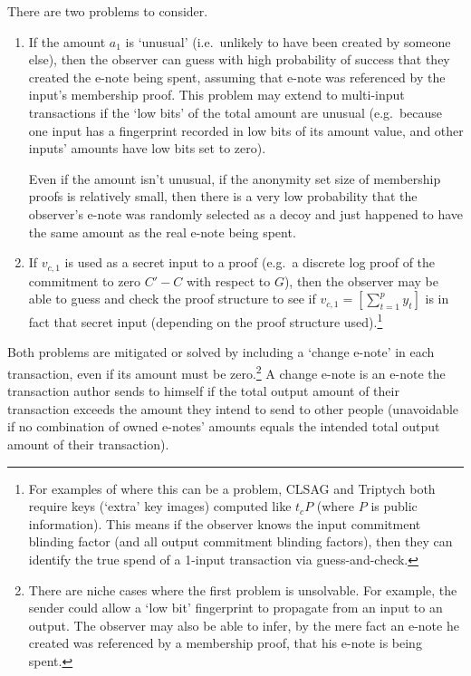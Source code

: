 There are two problems to consider.
\begin{enumerate}
    \item If the amount $a_1$ is `unusual' (i.e.\ unlikely to have been created by someone else), then the observer can guess with high probability of success that they created the e-note being spent, assuming that e-note was referenced by the input's membership proof. This problem may extend to multi-input transactions if the `low bits' of the total amount are unusual (e.g.\ because one input has a fingerprint recorded in low bits of its amount value, and other inputs' amounts have low bits set to zero).

    Even if the amount isn't unusual, if the anonymity set size of membership proofs is relatively small, then there is a very low probability that the observer's e-note was randomly selected as a decoy and just happened to have the same amount as the real e-note being spent.

    \item If $v_{c,1}$ is used as a secret input to a proof (e.g.\ a discrete log proof of the commitment to zero $C' - C$ with respect to $G$), then the observer may be able to guess and check the proof structure to see if $v_{c,1} = [\sum^{p}_{t=1} y_t]$ is in fact that secret input (depending on the proof structure used).\footnote{For examples of where this can be a problem, CLSAG \cite{clsag-eprint} and Triptych \cite{triptych-preprint} both require keys (`extra' key images) computed like $t_c P$ (where $P$ is public information). This means if the observer knows the input commitment blinding factor (and all output commitment blinding factors), then they can identify the true spend of a 1-input transaction via guess-and-check.}
\end{enumerate}

Both problems are mitigated or solved by including a `change e-note' in each transaction, even if its amount must be zero.\footnote{There are niche cases where the first problem is unsolvable. For example, the sender could allow a `low bit' fingerprint to propagate from an input to an output. The observer may also be able to infer, by the mere fact an e-note he created was referenced by a membership proof, that his e-note is being spent.} A change e-note is an e-note the transaction author sends to himself if the total output amount of their transaction exceeds the amount they intend to send to other people (unavoidable if no combination of owned e-notes' amounts equals the intended total output amount of their transaction).


